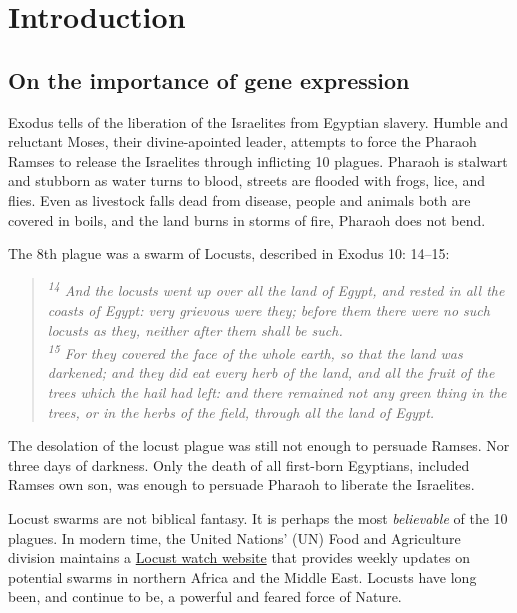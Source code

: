 \chapter{Introduction} %
\label{Chapter1} %

\section{On the importance of gene expression}\label{sec:Importatance of Gene Expression} 

Exodus tells of the liberation of the Israelites from Egyptian slavery. Humble and reluctant Moses, their divine-apointed leader, attempts to force the Pharaoh Ramses to release the Israelites through inflicting 10 plagues. Pharaoh is stalwart and stubborn as water turns to blood, streets are flooded with frogs, lice, and flies. Even as livestock falls dead from disease, people and animals both are covered in boils, and the land burns in storms of fire, Pharaoh does not bend.

The 8th plague was a swarm of Locusts, described in Exodus 10: 14–15:

\begin{quote}
	\itshape %
	\singlespacing
	\textsuperscript{14
	} And the locusts went up over all the land of Egypt, and rested in all the coasts of Egypt: very grievous were they; before them there were no such locusts as they, neither after them shall be such.\\
	\textsuperscript{15} For they covered the face of the whole earth, so that the land was darkened; and they did eat every herb of the land, and all the fruit of the trees which the hail had left: and there remained not any green thing in the trees, or in the herbs of the field, through all the land of Egypt.
\end{quote}

The desolation of the locust plague was still not enough to persuade Ramses. Nor three days of darkness. Only the death of all first-born Egyptians, included Ramses own son, was enough to persuade Pharaoh to liberate the Israelites.

Locust swarms are not biblical fantasy. It is perhaps the most \textit{believable} of the 10 plagues. In modern time, the United Nations' (UN) Food and Agriculture division maintains a \href{http://www.fao.org/ag/locusts/en/info/info/news/index.html}{Locust watch website} that provides weekly updates on potential swarms in northern Africa and the Middle East. Locusts have long been, and continue to be, a powerful and feared force of Nature.


